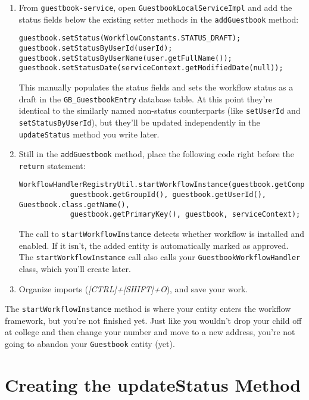 \begin{enumerate}
\def\labelenumi{\arabic{enumi}.}
\item
  From \texttt{guestbook-service}, open
  \texttt{GuestbookLocalServiceImpl} and add the status fields below the
  existing setter methods in the \texttt{addGuestbook} method:

\begin{verbatim}
guestbook.setStatus(WorkflowConstants.STATUS_DRAFT);
guestbook.setStatusByUserId(userId);
guestbook.setStatusByUserName(user.getFullName());
guestbook.setStatusDate(serviceContext.getModifiedDate(null));
\end{verbatim}

  This manually populates the status fields and sets the workflow status
  as a draft in the \texttt{GB\_GuestbookEntry} database table. At this
  point they're identical to the similarly named non-status counterparts
  (like \texttt{setUserId} and \texttt{setStatusByUserId}), but they'll
  be updated independently in the \texttt{updateStatus} method you write
  later.
\item
  Still in the \texttt{addGuestbook} method, place the following code
  right before the \texttt{return} statement:

\begin{verbatim}
WorkflowHandlerRegistryUtil.startWorkflowInstance(guestbook.getCompanyId(), 
            guestbook.getGroupId(), guestbook.getUserId(), Guestbook.class.getName(), 
            guestbook.getPrimaryKey(), guestbook, serviceContext);
\end{verbatim}

  The call to \texttt{startWorkflowInstance} detects whether workflow is
  installed and enabled. If it isn't, the added entity is automatically
  marked as approved. The \texttt{startWorkflowInstance} call also calls
  your \texttt{GuestbookWorkflowHandler} class, which you'll create
  later.
\item
  Organize imports (\emph{{[}CTRL{]}+{[}SHIFT{]}+O}), and save your
  work.
\end{enumerate}

The \texttt{startWorkflowInstance} method is where your entity enters
the workflow framework, but you're not finished yet. Just like you
wouldn't drop your child off at college and then change your number and
move to a new address, you're not going to abandon your
\texttt{Guestbook} entity (yet).

\section{Creating the updateStatus
Method}\label{creating-the-updatestatus-method}

